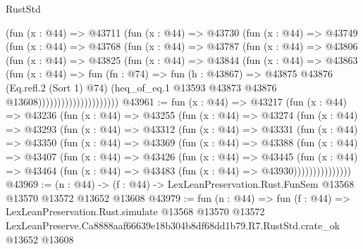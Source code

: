 \begin{lexlean}{RustStd}
\begin{coremodule}
                        (fun (x : @44) =>
                        @43711
                          (fun (x : @44) =>
                          @43730
                            (fun (x : @44) =>
                            @43749
                              (fun (x : @44) =>
                              @43768
                                (fun (x : @44) =>
                                @43787
                                  (fun (x : @44) =>
                                  @43806
                                    (fun (x : @44) =>
                                    @43825
                                      (fun (x : @44) =>
                                      @43844
                                        (fun (x : @44) =>
                                        @43863
                                          (fun (x : @44) =>
                                          fun (fn : @74) =>
                                          fun (h : @43867) =>
                                          @43875
                                            @43876
                                            (Eq.refl.{2} (Sort 1) @74)
                                            (heq_of_eq.{1}
                                              @13593
                                              @43873
                                              @43876
                                              @13608)))))))))))))))))))))
@43961 := fun (x : @44) =>
  @43217
    (fun (x : @44) =>
    @43236
      (fun (x : @44) =>
      @43255
        (fun (x : @44) =>
        @43274
          (fun (x : @44) =>
          @43293
            (fun (x : @44) =>
            @43312
              (fun (x : @44) =>
              @43331
                (fun (x : @44) =>
                @43350
                  (fun (x : @44) =>
                  @43369
                    (fun (x : @44) =>
                    @43388
                      (fun (x : @44) =>
                      @43407
                        (fun (x : @44) =>
                        @43426
                          (fun (x : @44) =>
                          @43445
                            (fun (x : @44) =>
                            @43464 (fun (x : @44) => @43483 (fun (x : @44) => @43930)))))))))))))))
@43969 := (n : @44) ->
  (f : @44) -> LexLeanPreservation.Rust.FunSem @13568 @13570 @13572 @13652 @13608
@43979 := fun (n : @44) =>
  fun (f : @44) =>
  LexLeanPreservation.Rust.simulate
    @13568
    @13570
    @13572
    LexLeanPreserve.Ca8888aaf66639e18b304b8df68dd1b79.R7.RustStd.crate_ok
    @13652
    @13608
\end{coremodule}
\end{lexlean}
